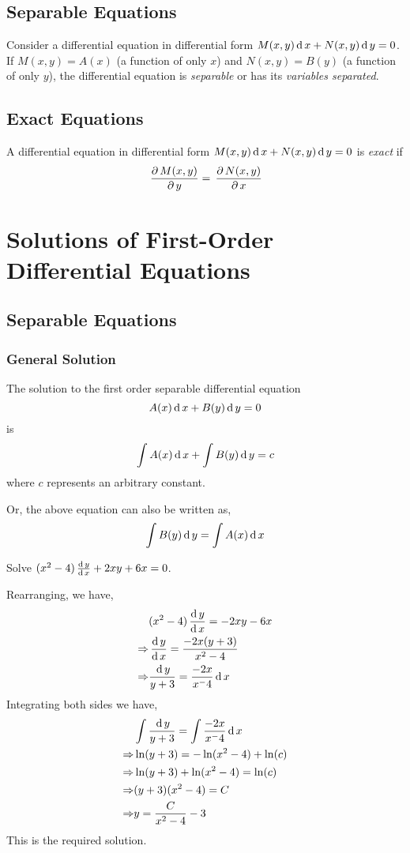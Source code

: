 \documentclass[12pt,oneside,a4paper]{article}
\begin{document}
\subsection{Separable Equations}
Consider  a differential equation in differential form $ M(x,y)\,\mathrm{d}\, x+N(x,y)\,\mathrm{d}\, y=0 $. If $ M(x,y)=A(x) $ (a function of only $ x $) and $ N(x,y)=B(y) $ (a function of only $ y $), the differential equation is \emph{separable} or has its \emph{variables separated}.
\subsection{Exact Equations}
A differential equation in  differential form $ M(x,y)\,\mathrm{d}\, x+N(x,y)\,\mathrm{d}\, y=0 $ is \emph{exact} if
\[\,\frac{\partial\, M(x,y)}{\partial\, y}=\,\frac{\partial\, N(x,y)}{\partial\, x}\]
\section{Solutions of First-Order Differential Equations}
\subsection{Separable Equations}
\subsubsection{General Solution}
The solution to the first order separable differential equation \[A(x)\,\mathrm{d}\, x+B(y)\,\mathrm{d}\, y=0 \] is \[\int A(x)\,\mathrm{d}\, x+\int B(y)\,\mathrm{d}\, y=c\] where $ c $ represents an arbitrary constant.

Or, the above equation can also be written as,\[\int B(y)\,\mathrm{d}\, y=\int A(x)\,\mathrm{d}\, x\]
\begin{prob}
    Solve $ (x^2-4)\,\frac{\mathrm{d}\,y}{\mathrm{d}\,x}+2xy+6x=0 $.
\end{prob}
\begin{soln}
    Rearranging, we have,
    \begin{align*}
                    & (x^2-4)\,\frac{\mathrm{d}\,y}{\mathrm{d}\,x}=-2xy-6x              \\
        \Rightarrow & \,\frac{\mathrm{d}\,y}{\mathrm{d}\,x}=\frac{-2x(y+3)}{x^2-4}      \\
        \Rightarrow & \frac{\,\mathrm{d}\, y}{y+3}=\frac{-2x}{x^-4}\,\mathrm{d}\, x
    \end{align*}
    Integrating both sides we have,
    \begin{align*}
                    & \int \frac{\,\mathrm{d}\, y}{y+3}=\int \frac{-2x}{x^-4}\,\mathrm{d}\, x \\
        \Rightarrow & \ln(y+3) = -\ln(x^2-4)+\ln(c)                 \\
        \Rightarrow & \ln(y+3) + \ln(x^2-4)=\ln(c)                  \\
        \Rightarrow & (y+3)(x^2-4)=C                                \\
        \Rightarrow & y=\frac{C}{x^2-4}-3                           \\
    \end{align*}
    This is the required solution.
\end{soln}
\end{document}
